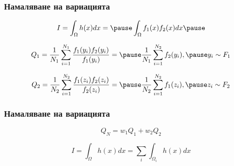 \begin{frame}
  \frametitle{Намаляване на вариацията}
  \begin{equation*}
  I = \int_{\Omega} h(x) d x = \pause 
  \int_{\Omega} f_1(x) f_2(x) dx \pause
  \end{equation*}

  \begin{equation*}
  Q_1 =  \frac{1}{N_1} \sum_{i=1}^{N_1} \frac{f_1(y_i)f_2(y_i)}{f_1(y_i)} = \pause
   \frac{1}{N_1} \sum_{i=1}^{N_2} f_2(y_i), \pause 
  y_i \sim F_1
  \end{equation*}
  \pause

  \begin{equation*}
  Q_2 =  \frac{1}{N_2} \sum_{i=1}^{N_2} \frac{f_1(z_i)f_2(z_i)}{f_2(z_i)} = \pause
   \frac{1}{N_2} \sum_{i=1}^{N_2} f_1(z_i), \pause
  z_i \sim F_2
  \end{equation*}


\end{frame}
\begin{frame}
  \frametitle{Намаляване на вариацията}
  \begin{equation*}
  Q_{N} = w_1 Q_1 + w_2 Q_2 
  \end{equation*} 
  \pause

  \begin{equation*}
  I = \int_{\Omega} h(x) d x =
  \sum_{i} \int_{\Omega_i} h(x) dx
  \end{equation*}
\end{frame}

